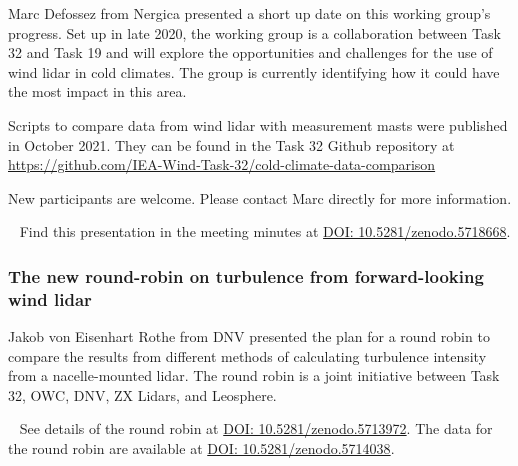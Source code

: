 Marc Defossez from Nergica presented a short up date on this working group's progress. Set up in late 2020, the working group is a collaboration between Task 32 and Task 19 and will explore the opportunities and challenges for the use of wind lidar in cold climates. The group is currently identifying how it could have the most impact in this area.

Scripts to compare data from wind lidar with measurement masts were published in October 2021. They can be found in the Task 32 Github repository at \href{https://github.com/IEA-Wind-Task-32/cold-climate-data-comparison}{https://github.com/IEA-Wind-Task-32/cold-climate-data-comparison}

New participants are welcome. Please contact Marc directly for more information.

\faFilePowerpointO ~ Find this presentation in the meeting minutes at \href{https://doi.org/10.5281/zenodo.5718668}{DOI: 10.5281/zenodo.5718668}.

\subsubsection{The new round-robin on turbulence from forward-looking wind lidar}

Jakob von Eisenhart Rothe from DNV presented the plan for a round robin to compare the results from different methods of calculating turbulence intensity from a nacelle-mounted lidar. The round robin is a joint initiative between Task 32, OWC, DNV, ZX Lidars, and Leosphere.

\faFilePowerpointO ~ See details of the round robin at \href{https://doi.org/10.5281/zenodo.5713972}{DOI: 10.5281/zenodo.5713972}. The data for the round robin are available at \href{https://doi.org/10.5281/zenodo.5714038}{DOI: 10.5281/zenodo.5714038}.



